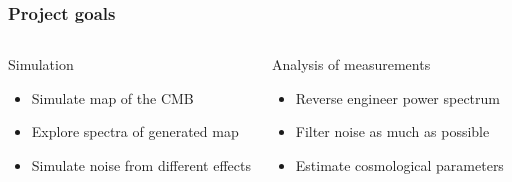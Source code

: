 \begin{frame}
\frametitle{Project goals}

\begin{columns}[onlytextwidth]
        \begin{block}{Simulation}
        	\begin{itemize}
        		\item Simulate map of the CMB
        		\item Explore spectra of generated map
        		\item Simulate noise from different effects
        	\end{itemize}
        \end{block}
        \begin{alertblock}{Analysis of measurements}
        	\begin{itemize}
        		\item Reverse engineer power spectrum
        		\item Filter noise as much as possible
        		\item Estimate cosmological parameters
        	\end{itemize}
        \end{alertblock}
\end{columns}

\end{frame}